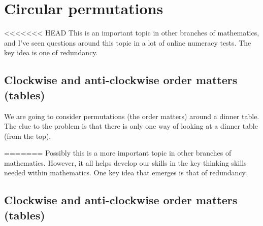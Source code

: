 \documentclass[12pt]{extbook}
\begin{document}





\section{Circular permutations}

<<<<<<< HEAD
This is an important topic in other branches of mathematics, and I've seen questions around this topic in a lot of online numeracy tests.  The key idea is one of redundancy.   

\subsection{Clockwise and anti-clockwise order matters (tables)}

We are going to consider permutations (the order matters) around a dinner table.   The clue to the problem is that there is only one way of looking at a dinner table (from the top).

=======
Possibly this is a more important topic in other branches of mathematics.  However, it all helps develop our skills in the key thinking skills needed within mathematics.   One key idea that emerges is that of redundancy.


\subsection{Clockwise and anti-clockwise order matters (tables)}
\end{document}
